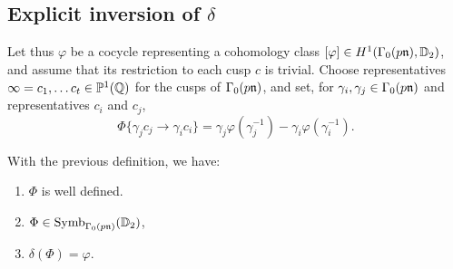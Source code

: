 \documentclass[a4paper,10pt]{article}
\numberwithin{equation}{section}
\begin{document}
\subsection{Explicit inversion of $\delta$}
Let thus $\varphi$ be a cocycle representing a cohomology class $[\varphi]\in H^1(\Gamma_0(p\mathfrak{n}),\mathbb{D}_2)$, and assume that its restriction to each cusp $c$ is trivial. Choose representatives $\infty=c_1,\ldots c_t\in \mathbb{P}^1(\mathbb{Q})$ for the cusps of $\Gamma_0(p\mathfrak{n})$, and set, for $\gamma_i,\gamma_j\in \Gamma_0(p\mathfrak{n})$ and representatives $c_i$ and $c_j$,
\[
\Phi\{\gamma_j c_j\rightarrow \gamma_i c_i\} = \gamma_j\varphi(\gamma_j^{-1})-\gamma_i\varphi(\gamma_i^{-1}).
\]
\begin{proposition}
With the previous definition, we have:
\begin{enumerate}
    \item $\Phi$ is well defined.
    \item $\Phi\in \mathrm{Symb}_{\Gamma_0(p\mathfrak{n})}(\mathbb{D}_2)$,
    \item $\delta(\Phi)=\varphi$.
\end{enumerate}
\end{proposition}
\end{document}
